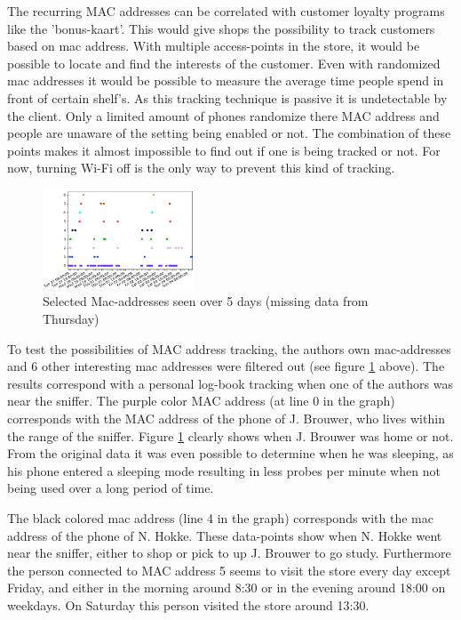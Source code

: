 \documentclass[conference,compsoc]{IEEEtran}
\begin{document}
The recurring MAC addresses can be correlated with customer loyalty programs like the 'bonus-kaart'. This would give shops the possibility to track customers based on mac address. With multiple access-points in the store, it would be possible to locate and find the interests of the customer. Even with randomized mac addresses it would be possible to measure the average time people spend in front of certain shelf's. As this tracking technique is passive it is undetectable by the client. Only a limited amount of phones randomize there MAC address and people are unaware of the setting being enabled or not. The combination of these points makes it almost impossible to find out if one is being tracked or not. For now, turning Wi-Fi off is the only way to prevent this kind of tracking. 

\begin{figure}[h!]
    \centering
    \includegraphics[width=0.4\textwidth]{img/selectedmac.png} 
    \caption{Selected Mac-addresses seen over 5 days (missing data from Thursday)}
    \label{fig:selected}
\end{figure}

To test the possibilities of MAC address tracking, the authors own mac-addresses and 6 other interesting mac addresses were filtered out (see figure \ref{fig:selected} above). The results correspond with a personal log-book tracking when one of the authors was near the sniffer. The purple color MAC address (at line 0 in the graph) corresponds with the MAC address of the phone of J. Brouwer, who lives within the range of the sniffer. Figure \ref{fig:selected} clearly shows when J. Brouwer was home or not. From the original data it was even possible to determine when he was sleeping, as his phone entered a sleeping mode resulting in less probes per minute when not being used over a long period of time.

The black colored mac address (line 4 in the graph) corresponds with the mac address of the phone of N. Hokke. These data-points show when N. Hokke went near the sniffer, either to shop or pick to up J. Brouwer to go study. Furthermore the person connected to MAC address 5 seems to visit the store every day except Friday, and either in the morning around 8:30 or in the evening around 18:00 on weekdays. On Saturday this person visited the store around 13:30. 
\end{document}
